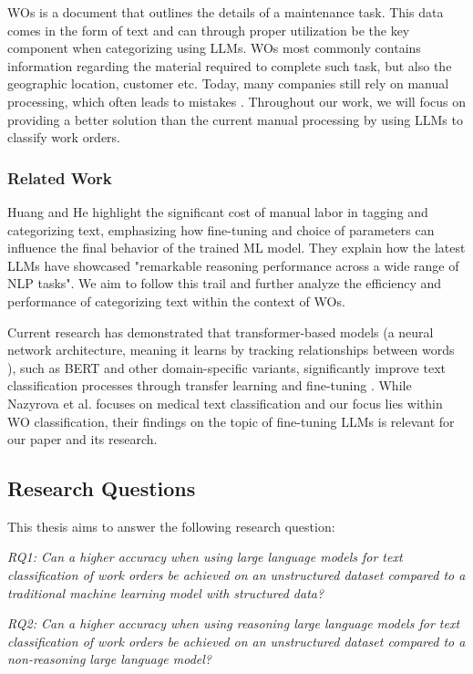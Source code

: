 WOs is a document that outlines the details of a maintenance task. This data
comes in the form of text and can through proper utilization be the key
component when categorizing using LLMs. WOs most commonly contains information regarding
the material required to complete such task, but also the geographic location, customer
etc. Today, many companies still rely on manual processing, which often leads to
mistakes \cite{ibm2023} \cite{li2024}. Throughout our work, we will focus on
providing a better solution than the current manual processing by using LLMs to
classify work orders.

\subsubsection{Related Work}

Huang and He \cite{huang2024} highlight the significant cost of manual labor in tagging and
categorizing text, emphasizing how fine-tuning and choice of parameters can influence the final
behavior of the trained ML model. They explain how the latest LLMs have showcased "remarkable
reasoning performance across a wide range of NLP tasks". We aim to follow this trail and
further analyze the efficiency and performance of categorizing text within the context of WOs.

\bigskip
Current research has demonstrated that transformer-based models (a neural
network architecture, meaning it learns by tracking relationships between words \cite{merritt2022}),
such as BERT and other domain-specific variants, significantly improve text
classification processes through transfer learning and fine-tuning
\cite{nazyrova2024}. While Nazyrova et al. focuses on medical text
classification and our focus lies within WO classification, their findings on the
topic of fine-tuning LLMs is relevant for our paper and its research.

\subsection{Research Questions}

This thesis aims to answer the following research question:

\bigskip
\textit{RQ1: Can a higher accuracy when using large language models for text classification
of work orders be achieved on an unstructured dataset compared to a traditional machine
learning model with structured data?}

\bigskip
\textit{RQ2: Can a higher accuracy when using reasoning large language models for
text classification of work orders be achieved on an unstructured dataset compared
to a non-reasoning large language model?}